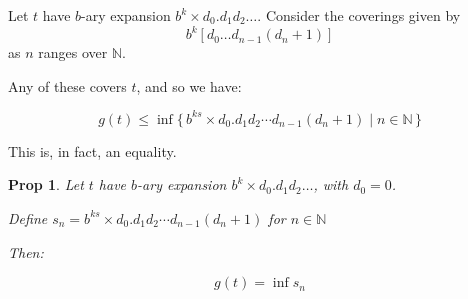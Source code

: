 \documentclass[11pt, reqno]{amsart}
\newcommand{\N}{\mathbb{N}}
\newtheorem{prop}{Prop}
\begin{document}
Let $t$ have $b$-ary expansion $b^k \times d_0 . d_1 d_2 \dots$. Consider the coverings given by
\[ b^k [d_0 \dots d_{n-1} (d_n + 1)] \]
as $n$ ranges over $\N$.

Any of these covers $t$, and so we have:

\[ g(t) \leq \inf \{\, b^{ks} \times d_0 . d_1 d_2 \cdots d_{n-1} (d_n + 1) \mid n \in \N\,\}\]

This is, in fact, an equality.

\begin{prop} \label{ginfs}
Let $t$ have $b$-ary expansion $b^k \times d_0 . d_1 d_2 \dots$, with $d_0 = 0$.

Define $s_n = b^{ks} \times d_0 . d_1 d_2 \cdots d_{n-1} (d_n + 1)$ for $n \in \N$

Then:

\[ g(t) = \inf s_n\]
\end{prop}
\end{document}

